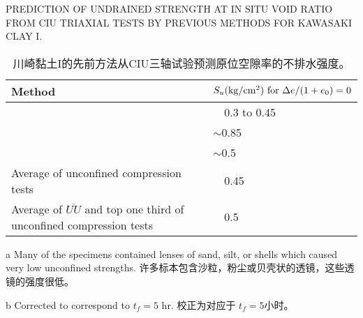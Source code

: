 \begin{table}[!htb]
    \centering
    \caption{PREDICTION OF UNDRAINED STRENGTH AT IN SITU VOID RATIO FROM CIU TRIAXIAL TESTS BY PREVIOUS METHODS FOR KAWASAKI CLAY I.}
    \addtocounter{table}{-1}
    \vspace{-8pt}
    \renewcommand{\tablename}{表}
    \caption{川崎黏土I的先前方法从CIU三轴试验预测原位空隙率的不排水强度。}
    \vspace{4pt}
    \renewcommand{\tablename}{Table}
    \begin{threeparttable}[b]
        \begin{tabularx}{\textwidth}{ll}
            \toprule
            Method & $S_u{\rm (kg/cm^2)~for}~ \Delta{}e/(1+e_0)=0$\\
            \midrule
            \citet{Schmertmann1956940} & ~~0.3 to 0.45 \\
            \citet{Calhoon1956925} & $\sim$0.85 \\
            \citet{Casagrande1947} & $\sim$0.5 \\
            Average of unconfined\tnote{a} compression tests & ~~0.45\tnote{b} \\
            Average of $\overline{UU}$ and top one third of unconfined compression tests & ~~0.5\tnote{b} \\
            \bottomrule
        \end{tabularx}%
        \begin{tablenotes}
            \item[a] Many of the specimens contained lenses of sand, silt, or shells which caused very low unconfined strengths. 许多标本包含沙粒，粉尘或贝壳状的透镜，这些透镜的强度很低。
            \item[b] Corrected to correspond to $t_f=5$ hr. 校正为对应于 $t_f=5$小时。
        \end{tablenotes}
    \end{threeparttable}
    \label{table:3}%
\end{table}
